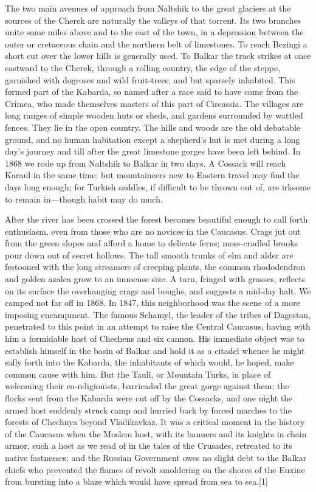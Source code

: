 \documentclass{article}
\begin{document}
	The two main avenues of approach from Naltshik to the great glaciers at the sources of the Cherek are naturally the valleys of that torrent. Its two branches unite some miles above and to the east of the town, in a depression between the outer or cretaceous chain and the northern belt of limestones. To reach Bezingi a short cut over the lower hills is generally used. To Balkar the track strikes at once eastward to the Cherek, through a rolling country, the edge of the steppe, garnished with dogroses and wild fruit-trees, and but sparsely inhabited. This formed part of the Kabarda, so named after a race said to have come from the Crimea, who made themselves masters of this part of Circassia. The villages are long ranges of simple wooden huts or sheds, and gardens surrounded by wattled fences. They lie in the open country. The hills and woods are the old debatable ground, and no human habitation except a shepherd's hut is met during a long day's journey and till after the great limestone gorges have been left behind. In 1868 we rode up from Naltshik to Balkar in two days. A Cossack will reach Karaul in the same time: but mountaineers new to Eastern travel may find the days long enough; for Turkish saddles, if difficult to be thrown out of, are irksome to remain in—though habit may do much.
	
	After the river has been crossed the forest becomes beautiful enough to call forth enthusiasm, even from those who are no novices in the Caucasus. Crags jut out from the green slopes and afford a home to delicate ferns; moss-cradled brooks pour down out of secret hollows. The tall smooth trunks of elm and alder are festooned with the long streamers of creeping plants, the common rhododendron and golden azalea grow to an immense size. A tarn, fringed with grasses, reflects on its surface the overhanging crags and boughs, and suggests a mid-day halt. We camped not far off in 1868. In 1847, this neighborhood was the scene of a more imposing encampment. The famous Schamyl, the leader of the tribes of Dagestan, penetrated to this point in an attempt to raise the Central Caucasus, having with him a formidable host of Chechens and six cannon. His immediate object was to establish himself in the basin of Balkar and hold it as a citadel whence he might sally forth into the Kabarda, the inhabitants of which would, he hoped, make common cause with him. But the Tauli, or Mountain Turks, in place of welcoming their co-religionists, barricaded the great gorge against them; the flocks sent from the Kabarda were cut off by the Cossacks, and one night the armed host suddenly struck camp and hurried back by forced marches to the forests of Chechnya beyond Vladikavkaz. It was a critical moment in the history of the Caucasus when the Moslem host, with its banners and its knights in chain armor, such a host as we read of in the tales of the Crusades, retreated to its native fastnesses; and the Russian Government owes no slight debt to the Balkar chiefs who prevented the flames of revolt smoldering on the shores of the Euxine from bursting into a blaze which would have spread from sea to sea.[1]
	
\end{document}
